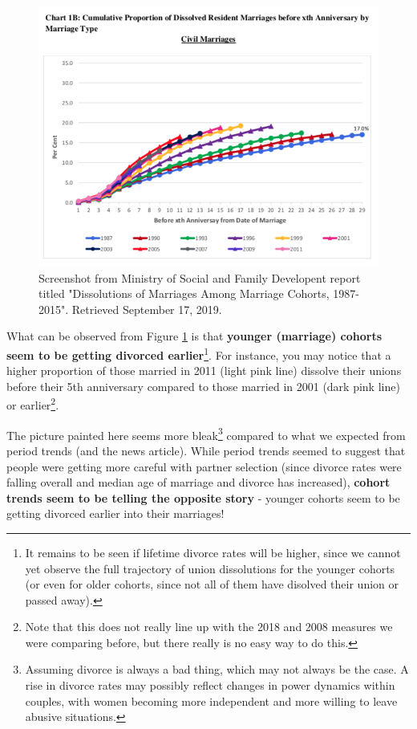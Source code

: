 \documentclass[openany]{book}
\let\rmarkdownfootnote\footnote%
\def\footnote{\protect\rmarkdownfootnote}
\begin{document}
\begin{figure}

{\centering \includegraphics[width=0.8\linewidth]{images/apc/report_fig2} 

}

\caption{Screenshot from Ministry of Social and Family Developent report titled "Dissolutions of Marriages Among Marriage Cohorts, 1987-2015". Retrieved September 17, 2019.}\label{fig:apc-reportmsf}
\end{figure}

What can be observed from Figure \ref{fig:apc-reportmsf} is that
\textbf{younger (marriage) cohorts seem to be getting divorced
earlier}\footnote{It remains to be seen if lifetime divorce rates will
  be higher, since we cannot yet observe the full trajectory of union
  dissolutions for the younger cohorts (or even for older cohorts, since
  not all of them have disolved their union or passed away).}. For
instance, you may notice that a higher proportion of those married in
2011 (light pink line) dissolve their unions before their 5th
anniversary compared to those married in 2001 (dark pink line) or
earlier\footnote{Note that this does not really line up with the 2018
  and 2008 measures we were comparing before, but there really is no
  easy way to do this.}.

The picture painted here seems more bleak\footnote{Assuming divorce is
  always a bad thing, which may not always be the case. A rise in
  divorce rates may possibly reflect changes in power dynamics within
  couples, with women becoming more independent and more willing to
  leave abusive situations.} compared to what we expected from period
trends (and the news article). While period trends seemed to suggest
that people were getting more careful with partner selection (since
divorce rates were falling overall and median age of marriage and
divorce has increased), \textbf{cohort trends seem to be telling the
opposite story} - younger cohorts seem to be getting divorced earlier
into their marriages!
\end{document}
